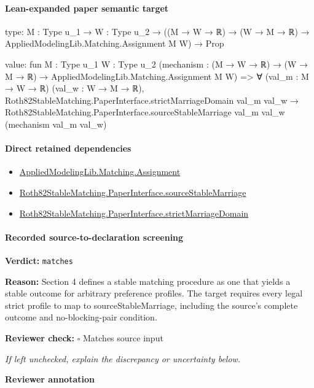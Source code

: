 \documentclass[10pt]{article}
\newcommand{\reviewerbox}{%
  \par\noindent\fbox{\parbox{0.96\linewidth}{\rule{0pt}{0.38in}}}\par
}
\newcommand{\reviewmatch}[1]{%
  \par\noindent\textbf{Reviewer check:} $\square$\; #1\par
  \noindent\emph{If left unchecked, explain the discrepancy or uncertainty below.}\par
}
\begin{document}
\paragraph{Lean-expanded paper semantic target}
\begin{ReviewVerbatim}
type:
{M : Type u_1} → {W : Type u_2} → ((M → W → ℝ) → (W → M → ℝ) → AppliedModelingLib.Matching.Assignment M W) → Prop

value:
fun {M : Type u_1} {W : Type u_2}
    (mechanism : (M → W → ℝ) → (W → M → ℝ) → AppliedModelingLib.Matching.Assignment M W) =>
  ∀ (val_m : M → W → ℝ) (val_w : W → M → ℝ),
    Roth82StableMatching.PaperInterface.strictMarriageDomain val_m val_w →
      Roth82StableMatching.PaperInterface.sourceStableMarriage val_m val_w (mechanism val_m val_w)
\end{ReviewVerbatim}

\paragraph{Direct retained dependencies}
\begin{itemize}\raggedright
\item \hyperlink{governing-declaration-508c084086b006b8}{Applied\allowbreak{}Modeling\allowbreak{}Lib.\allowbreak{}Matching.\allowbreak{}Assignment}
\item \hyperlink{paper-prerequisite-42fca1f7c299639c}{Roth82\allowbreak{}Stable\allowbreak{}Matching.\allowbreak{}Paper\allowbreak{}Interface.\allowbreak{}source\allowbreak{}Stable\allowbreak{}Marriage}
\item \hyperlink{governing-declaration-d06ec2a2987f0c72}{Roth82\allowbreak{}Stable\allowbreak{}Matching.\allowbreak{}Paper\allowbreak{}Interface.\allowbreak{}strict\allowbreak{}Marriage\allowbreak{}Domain}
\end{itemize}
\paragraph{Recorded source-to-declaration screening}
\textbf{Verdict:} \texttt{matches}
\\
{\raggedright
\textbf{Reason:} Section 4 defines a stable matching procedure as one that yields a stable outcome for arbitrary preference profiles.\allowbreak{}  The target requires every legal strict profile to map to sourceStableMarriage, including the source's complete outcome and no-\allowbreak{}blocking-\allowbreak{}pair condition.\allowbreak{}
\par}
\reviewmatch{Matches source input}
\noindent\textbf{Reviewer annotation}\par
\reviewerbox
\clearpage
\hypertarget{paper-prerequisite-6c23e95d9facee8d}{}
\end{document}
